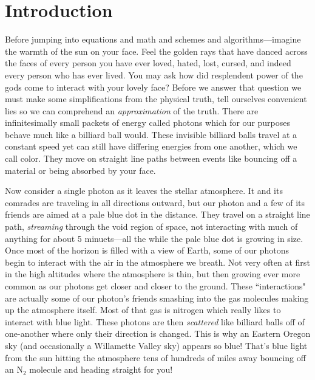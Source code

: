 
\chapter{Introduction}
\label{chap:intro}



Before jumping into equations and math and schemes and algorithms---imagine the warmth of the sun on your face.
Feel the golden rays that have danced across the faces of every person you have ever loved, hated, lost, cursed, and indeed every person who has ever lived.
You may ask how did resplendent power of the gods come to interact with your lovely face?
Before we answer that question we must make some simplifications from the physical truth, tell ourselves convenient lies so we can comprehend an \textit{approximation} of the truth.
There are infinitesimally small packets of energy called photons which for our purposes behave much like a billiard ball would.
These invisible billiard balls travel at a constant speed yet can still have differing energies from one another, which we call color.
They move on straight line paths between events like bouncing off a material or being absorbed by your face.

Now consider a single photon as it leaves the stellar atmosphere.
It and its comrades are traveling in all directions outward, but our photon and a few of its friends are aimed at a pale blue dot in the distance.
They travel on a straight line path, \textit{streaming} through the void region of space, not interacting with much of anything for about 5 minuets---all the while the pale blue dot is growing in size.
Once most of the horizon is filled with a view of Earth, some of our photons begin to interact with the air in the atmosphere we breath.
Not very often at first in the high altitudes where the atmosphere is thin, but then growing ever more common as our photons get closer and closer to the ground.
These ``interactions" are actually some of our photon's friends smashing into the gas molecules making up the atmosphere itself.
Most of that gas is nitrogen which really likes to interact with blue light.
These photons are then \textit{scattered} like billiard balls off of one-another where only their direction is changed.
This is why an Eastern Oregon sky (and occasionally a Willamette Valley sky) appears so blue!
That's blue light from the sun hitting the atmosphere tens of hundreds of miles away bouncing off an N$_2$ molecule and heading straight for you!

